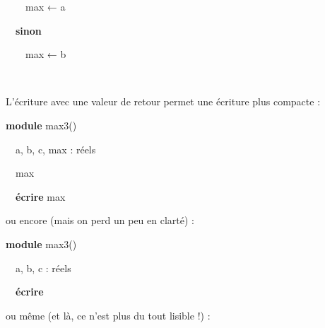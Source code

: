 {\sffamily
\ \ \ \ max{ }{← a}}

{\sffamily
\ \ \textbf{sinon}}

{\sffamily
\ \ \ \ max{ }{← b}}

{\sffamily
\ \  }

{\sffamily
\textstyleMotCl{{\textmd{\ \ }}}}

{\sffamily
{}}

{
L'écriture avec une valeur de retour permet une
écriture plus compacte :}

{\sffamily
\textbf{module} max3()}

{\sffamily
\ \ a, b, c, max : réels}

{\sffamily
{}}

{\sffamily
{}}

{\sffamily
{}}

{\sffamily
\ \ max\textstyleCodeInsr{{
}}\textstyleCodeInsr{{
}}}

{\sffamily
\ \ \textbf{écrire} max}

{\sffamily
{}}

{
ou encore (mais on perd un peu en clarté) :}

{\sffamily
\textbf{module} max3()}

{\sffamily
\ \ a, b, c : réels}

{\sffamily
{}}

{\sffamily
{}}

{\sffamily
{}}

{\sffamily
\ \ \textbf{écrire} }

{\sffamily
{}}

{
ou même (et là, ce n'est plus du tout lisible !) :}

